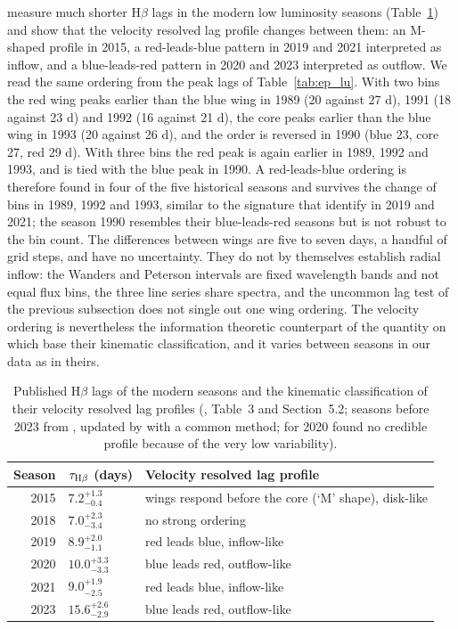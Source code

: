 \documentclass[fleqn,usenatbib]{mnras}
\newenvironment{SURDtable}{\begin{table}}{\end{table}}
\begin{document}
\citet{Xi2025} measure much shorter H$\beta$ lags in the modern low luminosity
seasons (Table~\ref{tab:ep_xi}) and show that the velocity resolved lag profile
changes between them: an M-shaped profile in 2015, a red-leads-blue pattern in 2019
and 2021 interpreted as inflow, and a blue-leads-red pattern in 2020 and 2023
interpreted as outflow. We read the same ordering from the peak lags of
Table~\ref{tab:ep_lu}. With two bins the red wing peaks earlier than the blue wing in
1989 (20 against 27 d), 1991 (18 against 23 d) and 1992 (16 against 21 d), the core
peaks earlier than the blue wing in 1993 (20 against 26 d), and the order is reversed
in 1990 (blue 23, core 27, red 29 d). With three bins the red peak is again earlier
in 1989, 1992 and 1993, and is tied with the blue peak in 1990. A red-leads-blue
ordering is therefore found in four of the five historical seasons and survives the
change of bins in 1989, 1992 and 1993, similar to the signature that
\citet{Xi2025} identify in 2019 and 2021; the season 1990 resembles their
blue-leads-red seasons but is not robust to the bin count. The differences between
wings are five to seven days, a handful of grid steps, and have no uncertainty.
They do not by themselves establish radial inflow: the Wanders and Peterson
intervals are fixed wavelength bands and not equal flux bins, the three line
series share spectra, and the uncommon lag test of the previous subsection does
not single out one wing ordering. The velocity ordering is nevertheless the
information theoretic counterpart of the quantity on which \citet{Xi2025} base
their kinematic classification, and it varies between seasons in our data as in
theirs.

\begin{SURDtable}
\centering
\caption{Published H$\beta$ lags of the modern seasons and the kinematic
classification of their velocity resolved lag profiles (\citealt{Xi2025},
Table~3 and Section~5.2; seasons before 2023 from \citealt{Lu2022}, updated by
\citealt{Xi2025} with a common method; for 2020 \citealt{Lu2022} found no credible
profile because of the very low variability).}
\label{tab:ep_xi}
\small
\begin{tabular}{rll}
\toprule
Season & $\tau_{\rm H\beta}$ (days) & Velocity resolved lag profile \\
\midrule
2015 & $7.2^{+1.3}_{-0.4}$ & wings respond before the core (`M' shape), disk-like \\
2018 & $7.0^{+2.3}_{-3.4}$ & no strong ordering \\
2019 & $8.9^{+2.0}_{-1.1}$ & red leads blue, inflow-like \\
2020 & $10.0^{+3.3}_{-3.3}$ & blue leads red, outflow-like \\
2021 & $9.0^{+1.9}_{-2.5}$ & red leads blue, inflow-like \\
2023 & $15.6^{+2.6}_{-2.9}$ & blue leads red, outflow-like \\
\bottomrule
\end{tabular}
\end{SURDtable}
\end{document}
